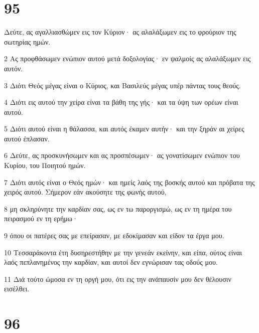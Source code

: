 \chapter{95}

\par Δεύτε, ας αγαλλιασθώμεν εις τον Κύριον· ας αλαλάξωμεν εις το φρούριον της σωτηρίας ημών.
\par 2 Ας προφθάσωμεν ενώπιον αυτού μετά δοξολογίας· εν ψαλμοίς ας αλαλάξωμεν εις αυτόν.
\par 3 Διότι Θεός μέγας είναι ο Κύριος, και Βασιλεύς μέγας υπέρ πάντας τους θεούς.
\par 4 Διότι εις αυτού την χείρα είναι τα βάθη της γής· και τα ύψη των ορέων είναι αυτού.
\par 5 Διότι αυτού είναι η θάλασσα, και αυτός έκαμεν αυτήν· και την ξηράν αι χείρες αυτού έπλασαν.
\par 6 Δεύτε, ας προσκυνήσωμεν και ας προσπέσωμεν· ας γονατίσωμεν ενώπιον του Κυρίου, του Ποιητού ημών.
\par 7 Διότι αυτός είναι ο Θεός ημών· και ημείς λαός της βοσκής αυτού και πρόβατα της χειρός αυτού. Σήμερον εάν ακούσητε της φωνής αυτού,
\par 8 μη σκληρύνητε την καρδίαν σας, ως εν τω παροργισμώ, ως εν τη ημέρα του πειρασμού εν τη ερήμω·
\par 9 όπου οι πατέρες σας με επείρασαν, με εδοκίμασαν και είδον τα έργα μου.
\par 10 Τεσσαράκοντα έτη δυσηρεστήθην με την γενεάν εκείνην, και είπα, ούτος είναι λαός πεπλανημένος την καρδίαν, και αυτοί δεν εγνώρισαν τας οδούς μου.
\par 11 Διά τούτο ώμοσα εν τη οργή μου, ότι εις την ανάπαυσίν μου δεν θέλουσιν εισέλθει.

\chapter{96}

